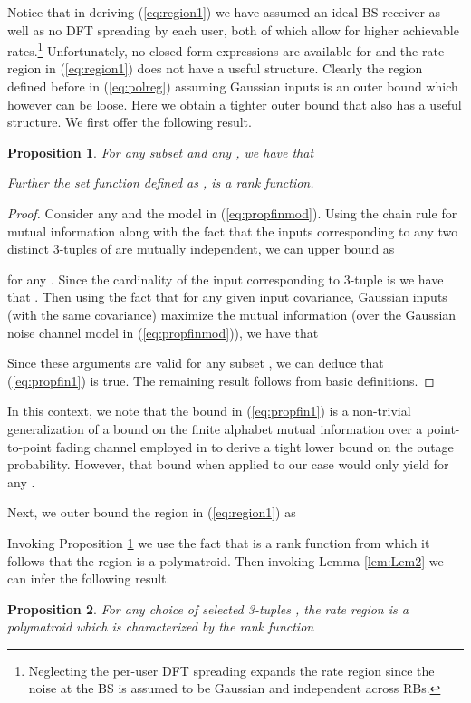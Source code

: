 \documentclass[11pt] {article}
\newtheorem{proposition}{Proposition}
\begin{document}
 Notice that in deriving (\ref{eq:region1}) we have assumed an ideal BS receiver as well as no DFT spreading by each user, both of which allow for higher achievable rates.\footnote{Neglecting the per-user  DFT spreading expands the rate region since the noise at the BS is assumed to be Gaussian and independent across RBs.}
 Unfortunately, no closed form expressions are available for 
  and the rate region in (\ref{eq:region1}) does not have a useful structure. Clearly the region defined before in (\ref{eq:polreg}) assuming Gaussian inputs is an outer bound which however can be loose. Here we obtain a tighter outer bound that also has a useful structure. We first offer the following result.
  \begin{proposition}\label{propfin}
  For any subset   and any , we have that
  
 Further the set function  defined as , is a rank function.
  \end{proposition}
  \begin{proof}
  Consider any  and the model in (\ref{eq:propfinmod}).
     Using the chain rule for mutual information along with the fact that the inputs corresponding to any two distinct 3-tuples of  are mutually independent, we can upper bound  as
     
      for any . Since the cardinality of the input corresponding to 3-tuple  is  we have that . Then using the fact   that  for any given input covariance, Gaussian inputs (with the same covariance) maximize the mutual information (over the Gaussian noise channel model in (\ref{eq:propfinmod})), we have that
      
       Since these arguments are valid for any subset , we can deduce that (\ref{eq:propfin1}) is true.
    The remaining result follows from basic definitions.
      \end{proof}

In this context, we note that the bound in (\ref{eq:propfin1}) is a non-trivial generalization of a bound on the finite alphabet mutual information over a point-to-point fading channel employed in \cite{fabregas:LB} to derive a tight lower bound on the outage probability. However, that bound when applied to our case would only yield  for any .

    Next, we   outer bound the region in (\ref{eq:region1}) as
    
  Invoking Proposition \ref{propfin} we use the fact that  is a rank function from which it follows that the region  is a polymatroid. Then invoking Lemma \ref{lem:Lem2} we can infer the following result.
   \begin{proposition}\label{propfin2}
  For any choice of selected 3-tuples , the  rate region
    is a polymatroid
 which is characterized by the rank function
  
  \end{proposition}
\end{document}
